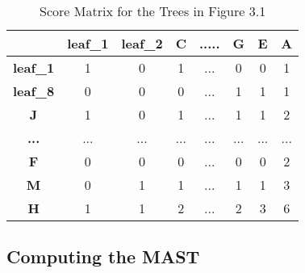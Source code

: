 \begin{table}[]
	\centering
	\begin{tabular}{|c|c|c|c|c|c|c|c|}
		\hline
		\textbf{}        & \textbf{leaf\_1} & \textbf{leaf\_2} & \textbf{C} & \textbf{.....} & \textbf{G} & \textbf{E} & \textbf{A} \\ \hline
		\textbf{leaf\_1} & 1                & 0                & 1          & ...            & 0          & 0          & 1          \\ \hline
		\textbf{leaf\_8} & 0                & 0                & 0          & ...            & 1          & 1          & 1          \\ \hline
		\textbf{J}       & 1                & 0                & 1          & ...            & 1          & 1          & 2          \\ \hline
		\textbf{...}     & ...              & ...              & ...        & ...            & ...        & ...        & ...        \\ \hline
		\textbf{F}       & 0                & 0                & 0          & ...            & 0          & 0          & 2          \\ \hline
		\textbf{M}       & 0                & 1                & 1          & ...            & 1          & 1          & 3          \\ \hline
		\textbf{H}       & 1                & 1                & 2          & ...            & 2          & 3          & 6          \\ \hline
	\end{tabular}
	
	\label{Table:Table1}
	\caption{Score Matrix for the Trees in Figure 3.1}
\end{table}




\subsection{Computing the MAST}

